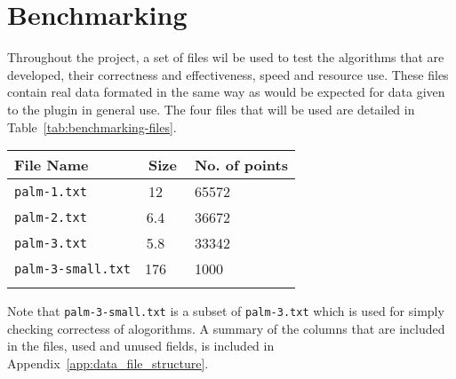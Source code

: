 
\section{Benchmarking}
\label{sec:benchmarking}

Throughout the project, a set of files wil be used to test the algorithms that
are developed, their correctness and effectiveness, speed and resource use.
These files contain real data formated in the same way as would be expected for
data given to the plugin in general use. The four files that will be used are
detailed in Table~\ref{tab:benchmarking-files}.

\renewcommand{\arraystretch}{1.3}
\begin{center}
\begin{tabu} {l c l}
	\toprule
	File Name & Size & No. of points \\
	\midrule
	\texttt{palm-1.txt} & \SI{12}{\mebi\byte} & 65572 \\
	\texttt{palm-2.txt} & \SI{6.4}{\mebi\byte} & 36672 \\
	\texttt{palm-3.txt} & \SI{5.8}{\mebi\byte} & 33342 \\
	\texttt{palm-3-small.txt} & \SI{176}{\kibi\byte} & 1000 \\
	\bottomrule
	\label{tab:benchmarking-files}
\end{tabu}
\end{center}

Note that \texttt{palm-3-small.txt} is a subset of \texttt{palm-3.txt} which is
used for simply checking correctess of alogorithms. A summary of the columns
that are included in the files, used and unused fields, is included in
Appendix~\ref{app:data_file_structure}.
